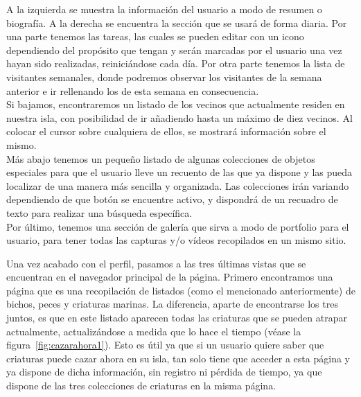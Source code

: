 
A la izquierda se muestra la información del usuario a modo de resumen o biografía. A la derecha se encuentra la sección que se usará de forma diaria. Por una parte tenemos las tareas, las cuales se pueden editar con un icono dependiendo del propósito que tengan y serán marcadas por el usuario una vez hayan sido realizadas, reiniciándose cada día. Por otra parte tenemos la lista de visitantes semanales, donde podremos observar los visitantes de la semana anterior e ir rellenando los de esta semana en consecuencia.\\

Si bajamos, encontraremos un listado de los vecinos que actualmente residen en nuestra isla, con posibilidad de ir añadiendo hasta un máximo de diez vecinos. Al colocar el cursor sobre cualquiera de ellos, se mostrará información sobre el mismo.\\

Más abajo tenemos un pequeño listado de algunas colecciones de objetos especiales para que el usuario lleve un recuento de las que ya dispone y las pueda localizar de una manera más sencilla y organizada. Las colecciones irán variando dependiendo de que botón se encuentre activo, y dispondrá de un recuadro de texto para realizar una búsqueda específica.\\

Por último, tenemos una sección de galería que sirva a modo de portfolio para el usuario, para tener todas las capturas y/o vídeos recopilados en un mismo sitio.\\

\clearpage

Una vez acabado con el perfil, pasamos a las tres últimas vistas que se encuentran en el navegador principal de la página. Primero encontramos una página que es una recopilación de listados (como el mencionado anteriormente) de bichos, peces y criaturas marinas. La diferencia, aparte de encontrarse los tres juntos, es que en este listado aparecen todas las criaturas que se pueden atrapar actualmente, actualizándose a medida que lo hace el tiempo {(v\'ease la figura~\ref{fig:cazarahora1})}. Esto es útil ya que si un usuario quiere saber que criaturas puede cazar ahora en su isla, tan solo tiene que acceder a esta página y ya dispone de dicha información, sin registro ni pérdida de tiempo, ya que dispone de las tres colecciones de criaturas en la misma página.\\

